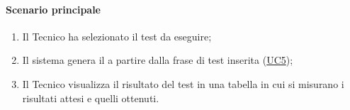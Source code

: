 \paragraph*{Scenario principale}
\begin{enumerate}
  \item Il Tecnico ha selezionato il test da eseguire;
  \item Il sistema genera il  a partire dalla frase di test inserita (\hyperref[UC5]{UC5});
  \item Il Tecnico visualizza il risultato del test in una tabella in cui si misurano i risultati attesi e quelli ottenuti. %
\end{enumerate}

